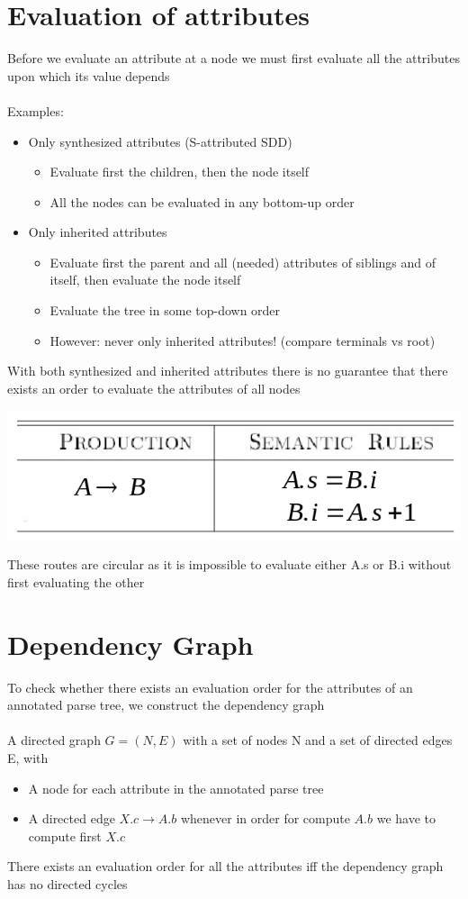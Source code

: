 \documentclass{article}[18pt]
\begin{document}
\section{Evaluation of attributes}
Before we evaluate an attribute at a node we must first evaluate all the attributes upon which its value depends\\
\\
Examples:
\begin{itemize}
	\item Only synthesized attributes (S-attributed SDD)
	\begin{itemize}
		\item Evaluate first the children, then the node itself
		\item All the nodes can be evaluated in any bottom-up order
	\end{itemize}
	\item Only inherited attributes
	\begin{itemize}
		\item Evaluate first the parent and all (needed) attributes of siblings and of itself, then evaluate the node itself
		\item Evaluate the tree in some top-down order
		\item However: never only inherited attributes! (compare terminals vs root)
	\end{itemize}
\end{itemize}
With both synthesized and inherited attributes there is no guarantee that there exists an order to evaluate the attributes of all nodes
\begin{center}
	\includegraphics[scale=0.7]{Evaluation_Attributes}
\end{center}
These routes are circular as it is impossible to evaluate either A.s or B.i without first evaluating the other
\section{Dependency Graph}
To check whether there exists an evaluation order for the attributes of an annotated parse tree, we construct the dependency graph\\
\\
A directed graph $G=(N,E)$ with a set of nodes N and a set of directed edges E, with
\begin{itemize}
	\item A node for each attribute in the annotated parse tree
	\item A directed edge $X.c\rightarrow A.b$ whenever in order for compute $A.b$ we have to compute first $X.c$
\end{itemize}
There exists an evaluation order for all the attributes iff the dependency graph has no directed cycles
\newpage
\end{document}
